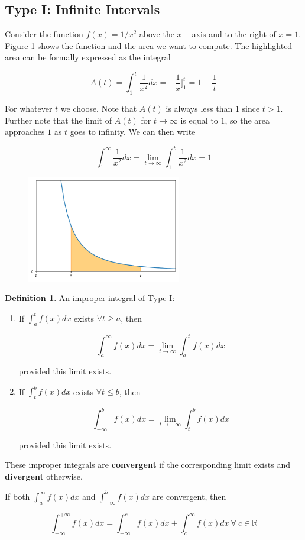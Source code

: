 \documentclass[a4paper,11pt]{article}
\theoremstyle{definition}
\newtheorem{definition}{Definition}
\theoremstyle{plain}
\begin{document}
\subsection{Type I: Infinite Intervals}\label{type-i-infinite-intervals}

Consider the function \(f(x) = 1/x^2\) above the \(x-\)axis and to the right of \(x = 1\). Figure \ref{fig:improper_type1} shows the function and the area we want to compute. The highlighted area can be formally expressed as the integral

\[
A(t) = \int^t_1 \frac{1}{x^2} dx = -\frac{1}{x}\Bigg]^t_1 = 1 - \frac{1}{t}
\]

For whatever \(t\) we choose. Note that \(A(t)\) is always less than \(1\) since \(t>1\). Further note that the limit of \(A(t)\) for \(t\rightarrow\infty\) is equal to \(1\), so the area approaches \(1\) as \(t\) goes to infinity. We can then write

\[
\int^{\infty}_1 \frac{1}{x^2} dx = \lim_{t\rightarrow\infty}\int^t_1\frac{1}{x^2} dx = 1
\]

\begin{figure}[htbp]
	\centering 
		\includegraphics[width=0.6\textwidth]{Ch3_files/Ch3_38_0.pdf}
		\caption{}
		\label{fig:improper_type1}
\end{figure}

\begin{definition}
An improper integral of Type I: 

\begin{enumerate}
	\item If \(\int^t_a f(x) dx\) exists \(\forall t\geq a\), then

	\[
	\int^{\infty}_a f(x) dx = \lim_{t\rightarrow\infty}\int^t_a f(x) dx
	\]

	provided this limit exists.
	\item  If \(\int^b_t f(x) dx\) exists \(\forall t\leq b\), then

	\[
	\int_{-\infty}^b f(x) dx = \lim_{t\rightarrow -\infty}\int^b_t f(x) dx
	\]

	provided this limit exists.
\end{enumerate}

These improper integrals are \textbf{convergent} if the corresponding limit exists and \textbf{divergent} otherwise.

If both \(\int^{\infty}_a f(x) dx\) and \(\int_{-\infty}^b f(x) dx\) are convergent, then

\[
\int_{-\infty}^{+\infty} f(x) dx = \int_{-\infty}^c f(x) dx + \int^{\infty}_c f(x) dx \ \forall \ c\in\mathbb{R}
\]
\end{definition}
\end{document}
